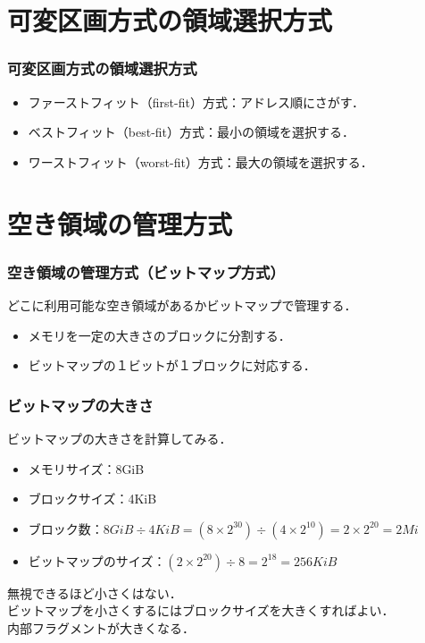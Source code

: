\documentclass{beamer}                   %
\begin{document}
\section{可変区画方式の領域選択方式}
\begin{frame}
  \frametitle{可変区画方式の領域選択方式}
  \begin{itemize}
  \item ファーストフィット（first-fit）方式：アドレス順にさがす．
  \item ベストフィット（best-fit）方式：最小の領域を選択する．
  \item ワーストフィット（worst-fit）方式：最大の領域を選択する．
  \end{itemize}
\end{frame}

\section{空き領域の管理方式}
\begin{frame}
  \frametitle{空き領域の管理方式（ビットマップ方式）}
  どこに利用可能な空き領域があるかビットマップで管理する．
  \begin{itemize}
  \item メモリを一定の大きさのブロックに分割する．
  \item ビットマップの１ビットが１ブロックに対応する．
  \end{itemize}
\end{frame}

\begin{frame}
  \frametitle{ビットマップの大きさ}
  ビットマップの大きさを計算してみる．
  \begin{itemize}
  \item メモリサイズ：8GiB
  \item ブロックサイズ：4KiB
  \item ブロック数：$8GiB \div 4KiB = (8\times 2^{30}) \div (4 \times 2^{10})
    = 2 \times 2^{20} = 2Mi$
  \item ビットマップのサイズ：$(2 \times 2^{20}) \div 8 = 2^{18} = 256KiB$
  \end{itemize}
  無視できるほど小さくはない．\\
  ビットマップを小さくするにはブロックサイズを大きくすればよい．\\
  内部フラグメントが大きくなる．
\end{frame}
\end{document}
